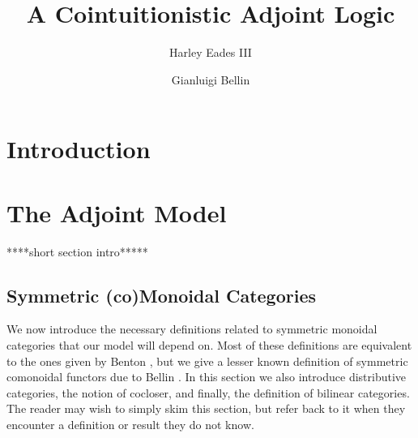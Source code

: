 \documentclass{lmcs}
\date{}
\begin{document}
\title{A Cointuitionistic Adjoint Logic}
\author{Harley Eades III}
\address{Computer Science, Augusta University, Augusta, GA}

\author{Gianluigi Bellin}
\address{Dipartimento di Informatica, Universit\`{a} di Verona, Strada Le Grazie, 37134 Verona, Italy}

\maketitle 

\begin{abstract}

  

\end{abstract}

\section{Introduction}
\label{sec:introduction}


\section{The Adjoint Model}
\label{sec:adjoint_model}

****short section intro*****

\subsection{Symmetric (co)Monoidal Categories}
\label{subsec:symmetric_monoidal_categories}
We now introduce the necessary definitions related to symmetric
monoidal categories that our model will depend on.  Most of these
definitions are equivalent to the ones given by Benton
\cite{Benton:1994}, but we give a lesser known definition of symmetric
comonoidal functors due to Bellin \cite{Bellin:2012}.  In this
section we also introduce distributive categories, the notion of
cocloser, and finally, the definition of bilinear categories.  The
reader may wish to simply skim this section, but refer back to it when
they encounter a definition or result they do not know.
\end{document}
